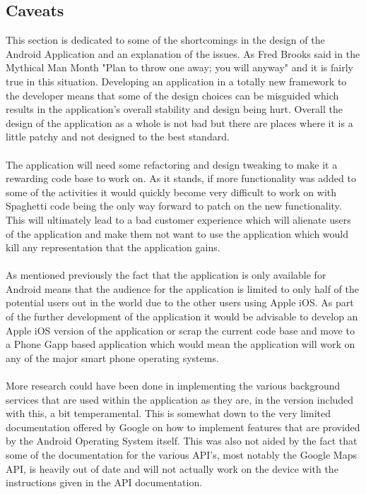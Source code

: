 \subsection{Caveats}

This section is dedicated to some of the shortcomings in the design of the Android Application and an explanation of the issues. As Fred Brooks said in the Mythical Man Month \cite{fredbrooks:throwoneaway:1995:online} "Plan to throw one away; you will anyway" and it is fairly true in this situation. Developing an application in a totally new framework to the developer means that some of the design choices can be misguided which results in the application's overall stability and design being hurt. Overall the design of the application as a whole is not bad but there are places where it is a little patchy and not designed to the best standard.\\
\\
The application will need some refactoring and design tweaking to make it a rewarding code base to work on. As it stands, if more functionality was added to some of the activities it would quickly become very difficult to work on with Spaghetti code being the only way forward to patch on the new functionality. This will ultimately lead to a bad customer experience which will alienate users of the application and make them not want to use the application which would kill any representation that the application gains.\\
\\
As mentioned previously the fact that the application is only available for Android means that the audience for the application is limited to only half of the potential users out in the world due to the other users using Apple iOS. As part of the further development of the application it would be advisable to develop an Apple iOS version of the application or scrap the current code base and move to a Phone Gapp based application which would mean the application will work on any of the major smart phone operating systems.\\
\\
More research could have been done in implementing the various background services that are used within the application as they are, in the version included with this, a bit temperamental. This is somewhat down to the very limited documentation offered by Google on how to implement features that are provided by the Android Operating System itself. This was also not aided by the fact that some of the documentation for the various API's, most notably the Google Maps API, is heavily out of date and will not actually work on the device with the instructions given in the API documentation.

